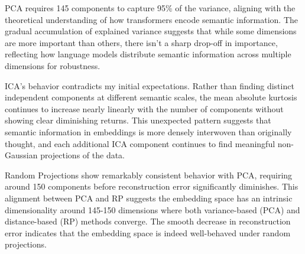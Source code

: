 \documentclass[conference]{IEEEtran}
\begin{document}
PCA requires 145 components to capture 95\% of the variance, aligning with the theoretical understanding of how transformers encode semantic information. The gradual accumulation of explained variance suggests that while some dimensions are more important than others, there isn't a sharp drop-off in importance, reflecting how language models distribute semantic information across multiple dimensions for robustness.

ICA's behavior contradicts my initial expectations. Rather than finding distinct independent components at different semantic scales, the mean absolute kurtosis continues to increase nearly linearly with the number of components without showing clear diminishing returns. This unexpected pattern suggests that semantic information in embeddings is more densely interwoven than originally thought, and each additional ICA component continues to find meaningful non-Gaussian projections of the data.

Random Projections show remarkably consistent behavior with PCA, requiring around 150 components before reconstruction error significantly diminishes. This alignment between PCA and RP suggests the embedding space has an intrinsic dimensionality around 145-150 dimensions where both variance-based (PCA) and distance-based (RP) methods converge. The smooth decrease in reconstruction error indicates that the embedding space is indeed well-behaved under random projections.
\end{document}
